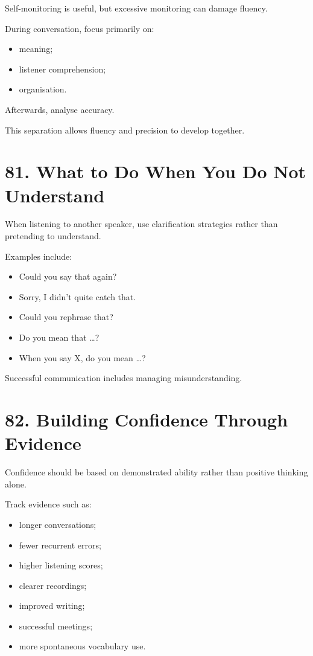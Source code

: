 Self-monitoring is useful, but excessive monitoring can damage fluency.

During conversation, focus primarily on:

\begin{itemize}
    \item meaning;
    \item listener comprehension;
    \item organisation.
\end{itemize}

Afterwards, analyse accuracy.

This separation allows fluency and precision to develop together.

\section*{81. What to Do When You Do Not Understand}

When listening to another speaker, use clarification strategies rather than pretending to understand.

Examples include:

\begin{itemize}
    \item Could you say that again?
    \item Sorry, I didn't quite catch that.
    \item Could you rephrase that?
    \item Do you mean that \ldots?
    \item When you say X, do you mean \ldots?
\end{itemize}

Successful communication includes managing misunderstanding.

\section*{82. Building Confidence Through Evidence}

Confidence should be based on demonstrated ability rather than positive thinking alone.

Track evidence such as:

\begin{itemize}
    \item longer conversations;
    \item fewer recurrent errors;
    \item higher listening scores;
    \item clearer recordings;
    \item improved writing;
    \item successful meetings;
    \item more spontaneous vocabulary use.
\end{itemize}

